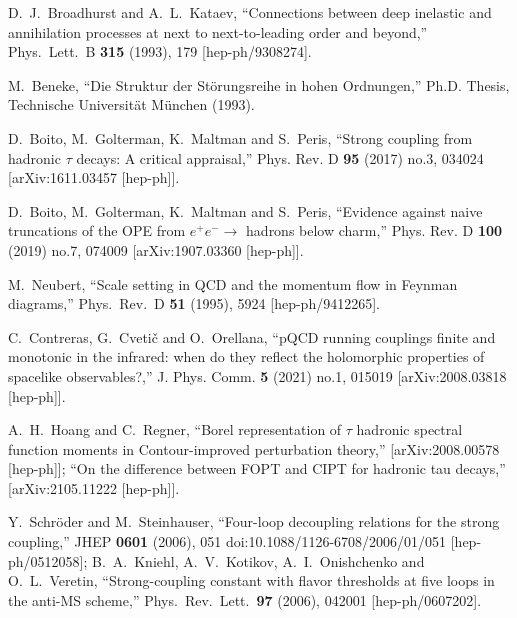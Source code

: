 \documentclass[aps,nofootinbib,showkeys,noshowpacs,preprintnumbers,amsmath,amssymb]{revtex4}
\begin{document}
\begin{thebibliography}{99}
  D.~J.~Broadhurst and A.~L.~Kataev,
  ``Connections between deep inelastic and annihilation processes at next to next-to-leading order and beyond,''
  Phys.\ Lett.\ B {\bf 315} (1993), 179
  [hep-ph/9308274].
  
  M.~Beneke, ``Die Struktur der St\"orungsreihe in hohen Ordnungen,'' Ph.D. Thesis, Technische Universit\"at M\"unchen (1993).


D.~Boito, M.~Golterman, K.~Maltman and S.~Peris,
``Strong coupling from hadronic $\tau$ decays: A critical appraisal,''
Phys. Rev. D \textbf{95} (2017) no.3, 034024
[arXiv:1611.03457 [hep-ph]].

D.~Boito, M.~Golterman, K.~Maltman and S.~Peris,
``Evidence against naive truncations of the OPE from $e^+e^- \to$ hadrons below charm,''
Phys. Rev. D \textbf{100} (2019) no.7, 074009
[arXiv:1907.03360 [hep-ph]].

  M.~Neubert,
  ``Scale setting in QCD and the momentum flow in Feynman diagrams,''
  Phys.\ Rev.\ D {\bf 51} (1995), 5924
  [hep-ph/9412265].
  
C.~Contreras, G.~Cveti\v{c} and O.~Orellana,
``pQCD running couplings finite and monotonic in the infrared: when do they reflect the holomorphic properties of spacelike observables?,''
J. Phys. Comm. \textbf{5} (2021) no.1, 015019
[arXiv:2008.03818 [hep-ph]].


A.~H.~Hoang and C.~Regner,
``Borel representation of $\tau$ hadronic spectral function moments in Contour-improved perturbation theory,''
[arXiv:2008.00578 [hep-ph]];
``On the difference between FOPT and CIPT for hadronic tau decays,''
[arXiv:2105.11222 [hep-ph]].
  
  Y.~Schr\"oder and M.~Steinhauser,
  ``Four-loop decoupling relations for the strong coupling,''
  JHEP {\bf 0601} (2006), 051
  doi:10.1088/1126-6708/2006/01/051
  [hep-ph/0512058];
  B.~A.~Kniehl, A.~V.~Kotikov, A.~I.~Onishchenko and O.~L.~Veretin,
  ``Strong-coupling constant with flavor thresholds at five loops in the anti-MS scheme,''
  Phys.\ Rev.\ Lett.\  {\bf 97} (2006), 042001
  [hep-ph/0607202].


\end{thebibliography}
\end{document}
